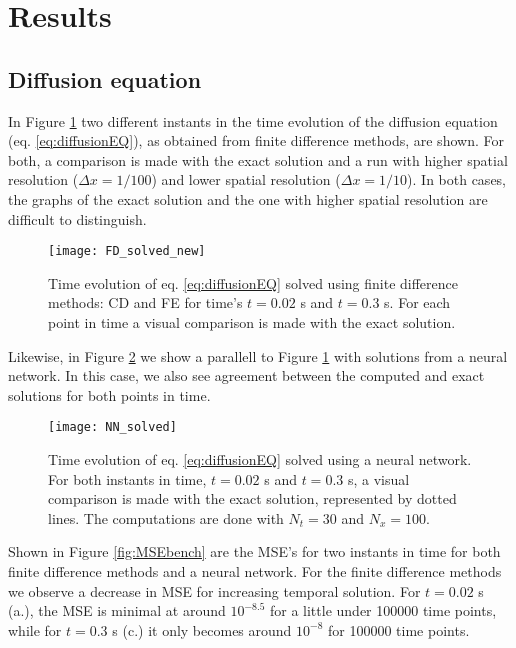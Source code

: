 \section{Results}
\label{sec:results}

\subsection{Diffusion equation}

In Figure \ref{fig:FDcompare} two different instants in the time evolution of the diffusion equation (eq. \ref{eq:diffusionEQ}), as obtained from finite difference methods, are shown. For both, a comparison is made with the exact solution and a run with higher spatial resolution ($\Delta x = 1/100$) and lower spatial resolution ($\Delta x = 1/10$). In both cases, the graphs of the exact solution and the one with higher spatial resolution are difficult to distinguish.
 \begin{figure}[htbp]
  	\centering
  	\texttt{[image: FD\_solved\_new]}
  	\caption{Time evolution of eq. \ref{eq:diffusionEQ} solved using finite difference methods: CD and FE for time's $t=0.02$ s and $t=0.3$ s. For each point in time a visual comparison is made with the exact solution.}
   \label{fig:FDcompare}
 \end{figure}

Likewise, in Figure \ref{fig:NNcompare} we show a parallell to Figure \ref{fig:FDcompare} with solutions from a neural network. In this case, we also see agreement between the computed and exact solutions for both points in time.
 \begin{figure}[htbp]
  	\centering
  	\texttt{[image: NN\_solved]}
  	\caption{Time evolution of eq. \ref{eq:diffusionEQ} solved using a neural network. For both instants in time, $t=0.02$ s and $t=0.3$ s, a visual comparison is made with the exact solution, represented by dotted lines. The computations are done with $N_t = 30$ and $N_x = 100$.}
   \label{fig:NNcompare}
 \end{figure}

Shown in Figure \ref{fig:MSEbench} are the MSE's for two instants in time for both finite difference methods and a neural network. For the finite difference methods we observe a decrease in MSE for increasing temporal solution. For $t=0.02$ s (a.), the MSE is minimal at around $10^{-8.5}$ for a little under 100000 time points, while for $t=0.3$ s (c.) it only becomes around $10^{-8}$ for 100000 time points.

